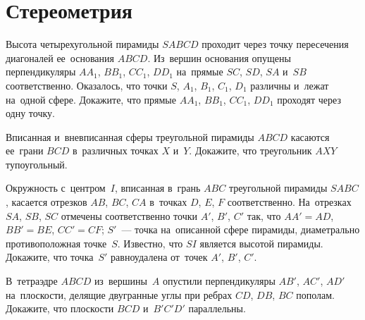 
\section*{Стереометрия}


\begin{problems}


\item
Высота четырехугольной пирамиды $SABCD$ проходит через точку пересечения
диагоналей ее~основания $ABCD$.
Из~вершин основания опущены перпендикуляры $A A_1$, $B B_1$, $C C_1$, $D D_1$
на~прямые $SC$, $SD$, $SA$ и~$SB$ соответственно.
Оказалось, что точки $S$, $A_1$, $B_1$, $C_1$, $D_1$ различны и~лежат на~одной
сфере.
Докажите, что прямые $A A_1$, $B B_1$, $C C_1$, $D D_1$ проходят через одну
точку.

\item
Вписанная и~вневписанная сферы треугольной пирамиды $ABCD$ касаются ее~грани
$BCD$ в~различных точках $X$ и~$Y$.
Докажите, что треугольник $AXY$ тупоугольный.

\item
Окружность с~центром~$I$, вписанная в~грань $ABC$ треугольной пирамиды $SABC$,
касается отрезков $AB$, $BC$, $CA$ в~точках $D$, $E$, $F$ соответственно.
На~отрезках $SA$, $SB$, $SC$ отмечены соответственно точки $A'$, $B'$, $C'$
так, что $AA' = AD$, $BB' = BE$, $CC' = CF$;
$S'$~--- точка на~описанной сфере пирамиды, диаметрально противоположная
точке~$S$.
Известно, что $SI$ является высотой пирамиды.
Докажите, что точка~$S'$ равноудалена от~точек $A'$, $B'$, $C'$.


\item
В~тетраэдре $ABCD$ из~вершины~$A$ опустили перпендикуляры $AB'$, $AC'$, $AD'$
на~плоскости, делящие двугранные углы при ребрах $CD$, $DB$, $BC$ пополам.
Докажите, что плоскости $BCD$ и~$B'C'D'$ параллельны.


\end{problems}
